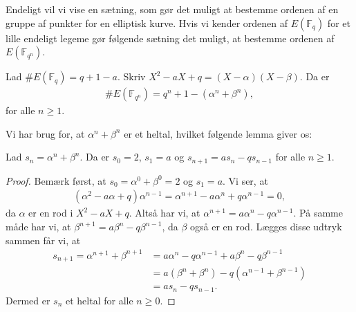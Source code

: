 Endeligt vil vi vise en sætning, som gør det muligt at bestemme ordenen af en gruppe af punkter for en elliptisk kurve. Hvis vi kender ordenen af $E(\mathbb{F}_q)$ for et lille endeligt legeme gør følgende sætning det muligt, at bestemme ordenen af $E(\mathbb{F}_{q^n})$.

\begin{thm}
\label{count}
Lad $\#E(\mathbb{F}_q) = q + 1 - a$. Skriv $X^2 - aX + q= (X-\alpha)(X-\beta)$. Da er
\begin{align*}
	\#E(\mathbb{F}_{q^n}) = q^n + 1 - (\alpha^n + \beta^n),
\end{align*}
for alle $n \geq 1$.
\end{thm}
Vi har brug for, at $\alpha^n + \beta^n$ er et heltal, hvilket følgende lemma giver os:

\begin{lemma}
Lad $s_n = \alpha^n + \beta^n$. Da er $s_0=2$, $s_1=a$ og $s_{n+1}=as_n - qs_{n-1}$ for alle $n \geq 1$.
\end{lemma}
\begin{proof}
Bemærk først, at $s_0 = \alpha^0 + \beta^0 = 2$ og $s_1 = a$.
Vi ser, at 
\begin{align*}
	(\alpha^2 - a\alpha + q) \alpha^{n-1} = \alpha^{n+1} - a \alpha^n + q\alpha^{n-1} = 0,
\end{align*}
da $\alpha$ er en rod i $X^2 - aX + q$. Altså har vi, at $\alpha^{n+1}=a \alpha^n - q\alpha^{n-1}$. På samme måde har vi, at $\beta^{n+1}=a \beta^n - q \beta^{n-1}$, da $\beta$ også er en rod. Lægges disse udtryk sammen får vi, at
\begin{align*}
	s_{n+1} = \alpha^{n+1} + \beta^{n+1} &= a \alpha^n - q \alpha^{n-1} + a \beta^n - q \beta^{n-1} \\
	&= a (\beta^n + \beta^n) - q (\alpha^{n-1} + \beta^{n-1}) \\
	&= a s_n - q s_{n-1}.
\end{align*}
Dermed er $s_n$ et heltal for alle $n \geq 0$.
\end{proof}

